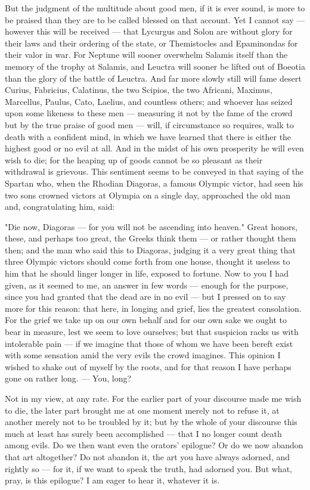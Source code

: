  But the judgment of the multitude about good men, if it is ever sound, is more to be praised than they are to be called blessed on that account. Yet I cannot say — however this will be received — that Lycurgus and Solon are without glory for their laws and their ordering of the state, or Themistocles and Epaminondas for their valor in war. For Neptune will sooner overwhelm Salamis itself than the memory of the trophy at Salamis, and Leuctra will sooner be lifted out of Boeotia than the glory of the battle of Leuctra. And far more slowly still will fame desert Curius, Fabricius, Calatinus, the two Scipios, the two Africani, Maximus, Marcellus, Paulus, Cato, Laelius, and countless others; and whoever has seized upon some likeness to these men — measuring it not by the fame of the crowd but by the true praise of good men — will, if circumstance so requires, walk to death with a confident mind, in which we have learned that there is either the highest good or no evil at all. And in the midst of his own prosperity he will even wish to die; for the heaping up of goods cannot be so pleasant as their withdrawal is grievous. This sentiment seems to be conveyed in that saying of the Spartan who, when the Rhodian Diagoras, a famous Olympic victor, had seen his two sons crowned victors at Olympia on a single day, approached the old man and, congratulating him, said:

 "Die now, Diagoras — for you will not be ascending into heaven." Great honors, these, and perhaps too great, the Greeks think them — or rather thought them then; and the man who said this to Diagoras, judging it a very great thing that three Olympic victors should come forth from one house, thought it useless to him that he should linger longer in life, exposed to fortune. Now to you I had given, as it seemed to me, an answer in few words — enough for the purpose, since you had granted that the dead are in no evil — but I pressed on to say more for this reason: that here, in longing and grief, lies the greatest consolation. For the grief we take up on our own behalf and for our own sake we ought to bear in measure, lest we seem to love ourselves; but that suspicion racks us with intolerable pain — if we imagine that those of whom we have been bereft exist with some sensation amid the very evils the crowd imagines. This opinion I wished to shake out of myself by the roots, and for that reason I have perhaps gone on rather long. — You, long?

 Not in my view, at any rate. For the earlier part of your discourse made me wish to die, the later part brought me at one moment merely not to refuse it, at another merely not to be troubled by it; but by the whole of your discourse this much at least has surely been accomplished — that I no longer count death among evils. Do we then want even the orators' epilogue? Or do we now abandon that art altogether? Do not abandon it, the art you have always adorned, and rightly so — for it, if we want to speak the truth, had adorned you. But what, pray, is this epilogue? I am eager to hear it, whatever it is.

